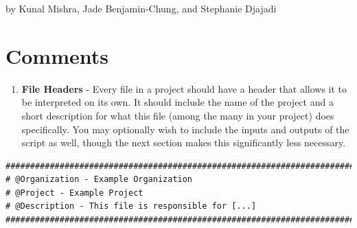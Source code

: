 \documentclass[
]{book}
\providecommand{\tightlist}{%
  \setlength{\itemsep}{0pt}\setlength{\parskip}{0pt}}
\begin{document}
by Kunal Mishra, Jade Benjamin-Chung, and Stephanie Djajadi

\section{Comments}\label{comments}

\begin{enumerate}
\def\labelenumi{\arabic{enumi}.}
\tightlist
\item
  \textbf{File Headers} - Every file in a project should have a header that allows it to be interpreted on its own. It should include the name of the project and a short description for what this file (among the many in your project) does specifically. You may optionally wish to include the inputs and outputs of the script as well, though the next section makes this significantly less necessary.
\end{enumerate}

\begin{verbatim}
################################################################################
# @Organization - Example Organization
# @Project - Example Project
# @Description - This file is responsible for [...]
################################################################################
\end{verbatim}
\end{document}
